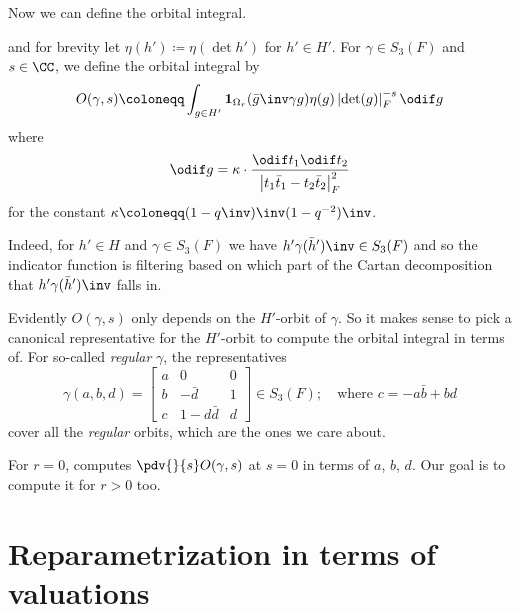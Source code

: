 Now we can define the orbital integral.
\begin{definition}
  and for brevity let $\eta(h') \coloneqq \eta(\det h')$ for $h' \in H'$.
  For $\gamma \in S_3(F)$ and $s \in \CC$, we define the orbital integral by
  \[ O(\gamma, s) \coloneqq
    \int_{g \in H'} \mathbf{1}_{\Omega_r}(\bar g\inv \gamma g) \eta(g)
    \left\lvert \det(g) \right\rvert_F^{-s} \odif g \]
  where
  \[ \odif g = \kappa \cdot \frac{\odif t_1 \odif t_2}
    {\left\lvert t_1 \bar t_1 - t_2 \bar t_2 \right\rvert_F^2} \]
  for the constant $\kappa \coloneqq (1-q\inv)\inv(1-q^{-2})\inv$.
\end{definition}

Indeed, for $h' \in H$ and $\gamma \in S_3(F)$ we have $h' \gamma (\bar h')\inv \in S_3(F)$
and so the indicator function is filtering based on which part of the
Cartan decomposition that $h' \gamma (\bar h')\inv$ falls in.

Evidently $O(\gamma, s)$ only depends on the $H'$-orbit of $\gamma$.
So it makes sense to pick a canonical representative for the $H'$-orbit to compute
the orbital integral in terms of.
For so-called \emph{regular} $\gamma$, the representatives
\[ \gamma(a,b,d) =
  \begin{bmatrix}
    a & 0 & 0 \\
    b & - \bar d & 1 \\
    c & 1 - d \bar d & d
  \end{bmatrix}
  \in S_3(F); \quad \text{where $c = -a \bar b + b d$} \]
cover all the \emph{regular} orbits, which are the ones we care about.

For $r=0$, \cite{ref:AFL} computes $\pdv{}{s}O(\gamma,s)$ at $s=0$ in terms of $a$, $b$, $d$.
Our goal is to compute it for $r > 0$ too.

\section{Reparametrization in terms of valuations}
